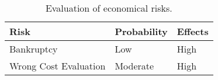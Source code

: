     \begin{table}[h]
\centering
    \begin{tabular}{| l | l | l |}
        \hline
        \textbf{Risk}                   & \textbf{Probability}  & \textbf{Effects}  \\
        \hline
        Bankruptcy & Low & High \\
        \hline
        Wrong Cost Evaluation & Moderate & High \\
        \hline
    \end{tabular}
    \caption{Evaluation of economical risks.}
\end{table}
